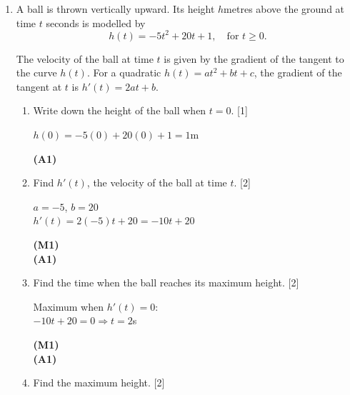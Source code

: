 \documentclass[12pt, twoside]{article}
\begin{document}
\begin{enumerate}[itemsep=0.2cm]
\newpage

\item A ball is thrown vertically upward. Its height $h$\;metres above the ground
at time $t$ seconds is modelled by
\[h(t) = -5t^2 + 20t + 1, \quad \text{for } t \geq 0.\]

The velocity of the ball at time $t$ is given by the gradient of the
tangent to the curve $h(t)$. For a quadratic $h(t) = at^2 + bt + c$,
the gradient of the tangent at $t$ is $h'(t) = 2at + b$.

\begin{enumerate}[itemsep=0.3cm]
  \item Write down the height of the ball when $t = 0$. \hfill [1]

  \begin{minipage}[t]{0.62\textwidth}
  $h(0) = -5(0) + 20(0) + 1 = 1$\;m
  \end{minipage}%
  \begin{minipage}[t]{0.35\textwidth}\raggedleft
  \textbf{(A1)}
  \end{minipage}

  \medskip
  \item Find $h'(t)$, the velocity of the ball at time $t$. \hfill [2]

  \begin{minipage}[t]{0.62\textwidth}
  $a = -5$, $b = 20$\\[0.15cm]
  $h'(t) = 2(-5)t + 20 = -10t + 20$
  \end{minipage}%
  \begin{minipage}[t]{0.35\textwidth}\raggedleft
  \textbf{(M1)}\\[0.15cm]
  \textbf{(A1)}
  \end{minipage}

  \medskip
  \item Find the time when the ball reaches its maximum height. \hfill [2]

  \begin{minipage}[t]{0.62\textwidth}
  Maximum when $h'(t) = 0$:\\[0.15cm]
  $-10t + 20 = 0 \Rightarrow t = 2$\;s
  \end{minipage}%
  \begin{minipage}[t]{0.35\textwidth}\raggedleft
  \textbf{(M1)}\\[0.15cm]
  \textbf{(A1)}
  \end{minipage}

  \medskip
  \item Find the maximum height. \hfill [2]


\end{enumerate}
\end{enumerate}
\end{document}
